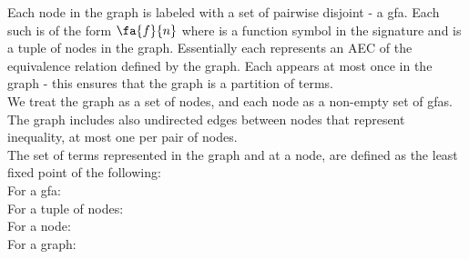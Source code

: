 


Each node in the graph is labeled with a set of pairwise disjoint - a gfa. Each such \GFA{} is of the form $\fa{f}{n}$ where  is a function symbol in the signature and  is a tuple of nodes in the graph. 
Essentially each \GFA{} represents an AEC of the equivalence relation defined by the graph.
Each \GFA{} appears at most once in the graph - this ensures that the graph is a partition of terms.\\
We treat the graph as a set of nodes, and each node as a non-empty set of gfas.
The graph includes also undirected edges between nodes that represent inequality, at most one per pair of nodes.\\
The set of terms represented in the graph and at a node, \GFA{} are defined as the least fixed point of the following: \\
For a gfa:            \\
For a tuple of nodes: \\
For a node:  \\
For a graph: 

